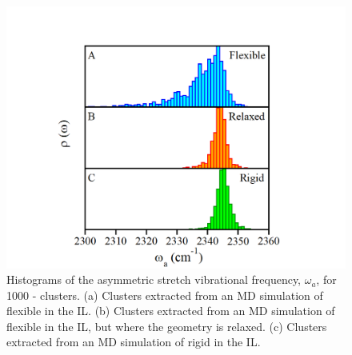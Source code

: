 \documentclass[]{article}
\begin{document}
\begin{figure}[h]
  \centering
  \includegraphics{figure5.png}
  \caption{Histograms of the  asymmetric stretch vibrational frequency, \(\omega_{a}\), for \num{1000} -\ce{[C4C1im][PF6]} clusters. (a) Clusters extracted from an MD simulation of flexible  in the \ce{[C4C1im][PF6]} IL. (b) Clusters extracted from an MD simulation of flexible  in the \ce{[C4C1im][PF6]} IL, but where the  geometry is relaxed. (c) Clusters extracted from an MD simulation of rigid  in the \ce{[C4C1im][PF6]} IL.}
  \label{paper_03:fig5}
\end{figure}
\end{document}
